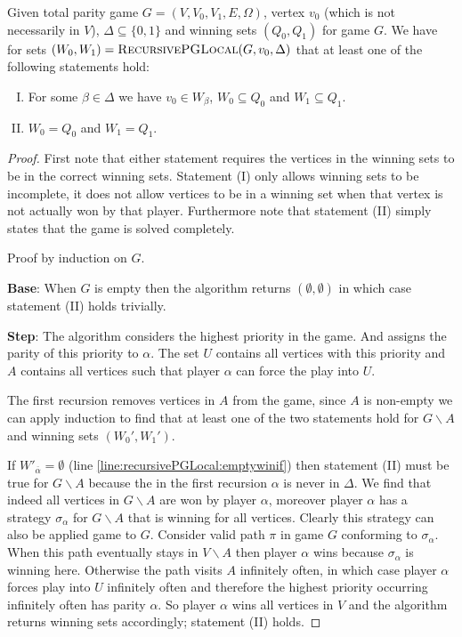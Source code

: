 \begin{theorem}
	Given total parity game $G = (V,V_0,V_1,E,\Omega)$, vertex $v_0$ (which is not necessarily in $V$), $\Delta \subseteq \{0,1\}$ and winning sets $(Q_0,Q_1)$ for game $G$. We have for sets $(W_0,W_1) = \textsc{RecursivePGLocal}(G,v_0,\Delta)$ that at least one of the following statements hold:
	\begin{enumerate}[(I)]
		\item For some $\beta \in \Delta$ we have $v_0 \in W_\beta$, $W_0 \subseteq Q_0$ and $W_1 \subseteq Q_1$.
		\item $W_0 = Q_0$ and $W_1 = Q_1$.
	\end{enumerate}
		\begin{proof}
			First note that either statement requires the vertices in the winning sets to be in the correct winning sets. Statement (I) only allows winning sets to be incomplete, it does not allow vertices to be in a winning set when that vertex is not actually won by that player. Furthermore note that statement (II) simply states that the game is solved completely.
			
			Proof by induction on $G$. 
			
			\textbf{Base}: When $G$ is empty then the algorithm returns $(\emptyset, \emptyset)$ in which case statement (II) holds trivially.
			
			\textbf{Step}: The algorithm considers the highest priority in the game. And assigns the parity of this priority to $\alpha$. The set $U$ contains all vertices with this priority and $A$ contains all vertices such that player $\alpha$ can force the play into $U$.
			
			The first recursion removes vertices in $A$ from the game, since $A$ is non-empty we can apply induction to find that at least one of the two statements hold for $G\backslash A$ and winning sets $(W_0',W_1')$.
			
			If $W'_{\overline{\alpha}} = \emptyset$ (line \ref{line:recursivePGLocal:emptywinif}) then statement (II) must be true for $G \backslash A$ because the in the first recursion $\alpha$ is never in $\Delta$. We find that indeed all vertices in $G\backslash A$ are won by player $\alpha$, moreover player $\alpha$ has a strategy $\sigma_\alpha$ for $G\backslash A$ that is winning for all vertices. Clearly this strategy can also be applied game to $G$. Consider valid path $\pi$ in game $G$ conforming to $\sigma_\alpha$. When this path eventually stays in $V \backslash A$ then player $\alpha$ wins because $\sigma_\alpha$ is winning here. Otherwise the path visits $A$ infinitely often, in which case player $\alpha$ forces play into $U$ infinitely often and therefore the highest priority occurring infinitely often has parity $\alpha$. So player $\alpha$ wins all vertices in $V$ and the algorithm returns winning sets accordingly; statement (II) holds.
			

\end{proof}
\end{theorem}
